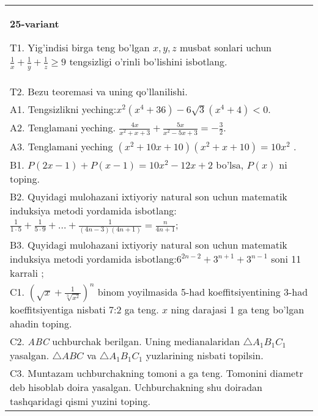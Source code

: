 \documentclass{article}
\begin{document}
\begin{tabular}{m{17cm}}
\textbf{25-variant}
\newline

T1. Yig'indisi birga teng bo'lgan \(x,y,z\) musbat sonlari uchun \(\frac{1}{x} + \frac{1}{y} + \frac{1}{z} \geq 9\) tengsizligi o'rinli bo'lishini isbotlang. \\
T2. Bezu teoremasi va uning qo'llanilishi. \\
A1. Tengsizlikni yeching:\(x^{2}\left( x^{4} + 36 \right) - 6\sqrt{3}\left( x^{4} + 4 \right) < 0\). \\
A2. Tenglamani yeching. \(\frac{4x}{x^{2} + x + 3} + \frac{5x}{x^{2} - 5x + 3} = - \frac{3}{2}\). \\
A3. Tenglamani yeching \(\left( x^{2} + 10x + 10 \right)\left( x^{2} + x + 10 \right) = 10x^{2}\) . \\
B1. \(P(2x - 1) + P(x - 1) = 10x^{2} - 12x + 2\) bo'lsa, \(P(x)\) ni toping. \\
B2. Quyidagi mulohazani ixtiyoriy natural son uchun matematik induksiya metodi yordamida isbotlang: \(\frac{1}{1 \cdot 5} + \frac{1}{5 \cdot 9} + ... + \frac{1}{(4n - 3)(4n + 1)} = \frac{n}{4n + 1}\); \\
B3. Quyidagi mulohazani ixtiyoriy natural son uchun matematik induksiya metodi yordamida isbotlang:\(6^{2n - 2} + 3^{n + 1} + 3^{n - 1}\) soni 11 karrali ; \\
C1. \(\left( \sqrt{x} + \frac{1}{\sqrt[3]{x^{2}}} \right)^{n}\) binom yoyilmasida 5-had koeffitsiyentining 3-had koeffitsiyentiga nisbati 7:2 ga teng. \(x\) ning darajasi 1 ga teng bo'lgan ahadin toping. \\
C2. \emph{ABC} uchburchak berilgan. Uning medianalaridan \(\bigtriangleup A_{1}B_{1}C_{1}\) yasalgan. \(\bigtriangleup ABC\) va \(\bigtriangleup A_{1}B_{1}C_{1}\) yuzlarining nisbati topilsin. \\
C3. Muntazam uchburchakning tomoni a ga teng. Tomonini diametr deb hisoblab doira yasalgan. Uchburchakning shu doiradan tashqaridagi qismi yuzini toping. \\

\end{tabular}
\vspace{1cm}
\end{document}
